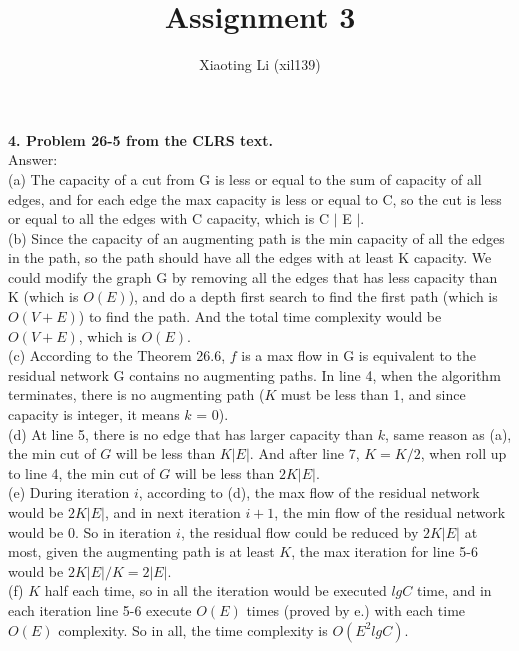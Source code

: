 \documentclass{article}
\title{Assignment 3}
\author{Xiaoting Li (xil139)}
\date{}
\begin{document}
\maketitle
\textbf{4. Problem 26-5 from the CLRS text.} \\
\noindent
Answer: \\
(a) The capacity of a cut from G is less or equal to the sum of capacity of all edges, and for each edge the max capacity is less or equal to C, so the cut is less or equal to all the edges with C capacity, which is C $|$ E $|$.\\
\newline
(b) Since the capacity of an augmenting path is the min capacity of all the edges in the path, so the path should have all the edges with at least K capacity. We could modify the graph G by removing all the edges that has less capacity than K (which is $O(E)$), and do a depth first search to find the first path (which is $O(V+E)$) to find the path. And the total time complexity would be $O(V+E)$, which is $O(E)$.  \\
\newline
(c) According to the Theorem 26.6, $f$ is a max flow in G is equivalent to the residual network G contains no augmenting paths. In line 4, when the algorithm terminates, there is no augmenting path ($K$ must be less than 1, and since capacity is integer, it means $k$ = 0).\\
\newline
(d) At line 5, there is no edge that has larger capacity than $k$, same reason as (a), the min cut of $G$ will be less than $K |E|$. And after line 7, $K = K/2$, when roll up to line 4, the min cut of $G$ will be less than $2K |E|$.\\
\newline
(e) During iteration $i$, according to (d), the max flow of the residual network would be $2K |E|$, and in next iteration $i+1$, the min flow of the residual network would be 0. So in iteration $i$, the residual flow could be reduced by  $2K |E|$ at most, given the augmenting path is at least $K$, the max iteration for line 5-6 would be $2K |E| / K =2 |E| $.\\
\newline
(f) $K$ half each time, so in all the iteration would be executed $lg C$ time, and in each iteration line 5-6 execute $O(E)$ times (proved by e.) with each time $O(E)$ complexity. So in all, the time complexity is $O(E^2lg C)$.\\
\newline
\end{document}

